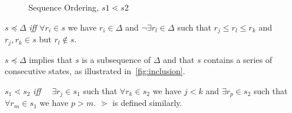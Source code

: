 \begin{figure}
\begin{minipage}{6cm}
\centerline{}
\caption{\label{fig:inclusion} {Sequence Inclusion, $s \preceq \Delta$}}
\end{minipage}
\hfill
\begin{minipage}{6cm}
\centerline{}
\caption{\label{fig:ordering} {Sequence Ordering, $s1 \lessdot s2$}}
\end{minipage}
\end{figure}
\begin{definition}\label{tl_def:inclusion}
\begin{rm}
$s \preceq \Delta$ {\em iff} $\forall r_i \in s$ we have $r_i \in \Delta$
and $\neg \exists r_l \in \Delta$ such that $r_j \le r_l \le r_k$ and
$r_j,r_k \in s$ but $r_l \not\in s$.
\end{rm}
\end{definition}

$s \preceq \Delta$ implies that $s$ is a subsequence of $\Delta$ and
that $s$ contains a series of consecutive states, as illustrated in~\ref{fig:inclusion}.

\begin{definition}
\begin{rm}
$s_1 \lessdot s_2$ {\em iff} $\quad \exists r_j \in s_1$ such that $\forall r_k
\in s_2$ we have $j < k$ and $\exists r_p \in s_2$ such that $\forall r_m
\in s_1$ we have $p > m$. $\gtrdot$ is defined similarly.
\end{rm}
\end{definition}


